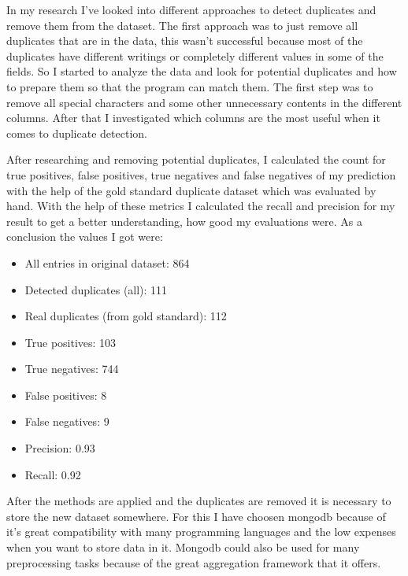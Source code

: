 \documentclass[conference]{IEEEtran}
\begin{document}
In my research I've looked into different approaches to detect duplicates and remove them from the dataset. The first approach was to just remove all duplicates that are in the data, this wasn't successful because most of the duplicates have different writings or completely different values in some of the fields. So I started to analyze the data and look for potential duplicates and how to prepare them so that the program can match them. The first step was to remove all special characters and some other unnecessary contents in the different columns. After that I investigated which columns are the most useful when it comes to duplicate detection. 

After researching and removing potential duplicates, I calculated the count for true positives, false positives, true negatives and false negatives of my prediction with the help of the gold standard duplicate dataset which was evaluated by hand. With the help of these metrics I calculated the recall and precision for my result to get a better understanding, how good my evaluations were. As a conclusion the values I got were: 
\begin{itemize}
	\item All entries in original dataset: 864
	\item Detected duplicates (all): 111
	\item Real duplicates (from gold standard): 112
	\item True positives: 103
	\item True negatives: 744
	\item False positives: 8
	\item False negatives: 9
	\item Precision: 0.93
	\item Recall: 0.92
\end{itemize}

After the methods are applied and the duplicates are removed it is necessary to store the new dataset somewhere. For this I have choosen mongodb because of it's great compatibility with many programming languages and the low expenses when you want to store data in it. Mongodb could also be used for many preprocessing tasks because of the great aggregation framework that it offers. 
\end{document}
